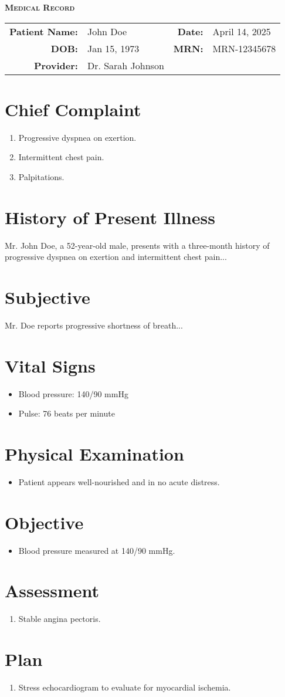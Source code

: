 \documentclass[letterpaper,11pt]{article}
\newcommand{\patientHeader}[5]{
  \begin{center}
    \textbf{\Large \scshape Medical Record} \\
    \vspace{10pt}
    \begin{tabular}{r l r l}
      \textbf{Patient Name:} & #1 & \textbf{Date:} & #2 \\
      \textbf{DOB:} & #3 & \textbf{MRN:} & #4 \\
      \textbf{Provider:} & #5 & & \\
    \end{tabular}
  \end{center}
  \vspace{0.8cm}
}
\newcommand{\paragraphSection}[2]{
  \section{#1}
  \vspace{-0.2cm}
  \begin{justify}
    #2
  \end{justify}
  \vspace{0.4cm}
}
\newcommand{\bulletSection}[2]{
  \section{#1}
  \vspace{-0.2cm}
  \begin{itemize}[leftmargin=0.5cm, label={\small\textbullet}, itemsep=0pt]
    #2
  \end{itemize}
  \vspace{0.4cm}
}
\newcommand{\numberedSection}[2]{
  \section{#1}
  \vspace{-0.2cm}
  \begin{enumerate}[leftmargin=0.7cm, label=\arabic*., itemsep=0pt]
    #2
  \end{enumerate}
  \vspace{0.4cm}
}
\newcommand{\vitalSignsSection}[5]{
  \section{Vital Signs}
  \vspace{-0.3cm}
  \begin{center}
    \begin{tabular}{|l|c|}
      \hline
      \textbf{Blood Pressure} & #1 \\
      \hline
      \textbf{Pulse} & #2 \\
      \hline
      \textbf{Respiratory Rate} & #3 \\
      \hline
      \textbf{Temperature} & #4 \\
      \hline
      \textbf{Oxygen Saturation} & #5 \\
      \hline
    \end{tabular}
  \end{center}
  \vspace{0.3cm}
}
\newcommand{\genericVitalSignsSection}[1]{
  \section{Vital Signs}
  \vspace{-0.3cm}
  \begin{itemize}[leftmargin=0.5cm, label={\small\textbullet}, itemsep=0pt]
    #1
  \end{itemize}
  \vspace{0.3cm}
}
\newcommand{\bulletItem}[1]{
  \item #1
}
\newcommand{\numberedItem}[1]{
  \item #1
}
\begin{document}
\patientHeader{John Doe}{April 14, 2025}{Jan 15, 1973}{MRN-12345678}{Dr. Sarah Johnson}

\numberedSection{Chief Complaint}{
    \numberedItem{Progressive dyspnea on exertion.}
  \numberedItem{Intermittent chest pain.}
  \numberedItem{Palpitations.}

}

\paragraphSection{History of Present Illness}{
  Mr. John Doe, a 52-year-old male, presents with a three-month history of progressive dyspnea on exertion and intermittent chest pain...
}

\paragraphSection{Subjective}{
  Mr. Doe reports progressive shortness of breath...
}

\genericVitalSignsSection{
    \bulletItem{Blood pressure: 140/90 mmHg}
  \bulletItem{Pulse: 76 beats per minute}

}

\bulletSection{Physical Examination}{
    \bulletItem{Patient appears well-nourished and in no acute distress.}

}

\bulletSection{Objective}{
    \bulletItem{Blood pressure measured at 140/90 mmHg.}

}

\numberedSection{Assessment}{
    \numberedItem{Stable angina pectoris.}

}

\numberedSection{Plan}{
    \numberedItem{Stress echocardiogram to evaluate for myocardial ischemia.}

}
\end{document}
